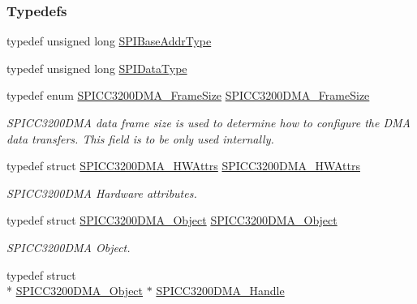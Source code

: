 \subsubsection*{Typedefs}
\begin{DoxyCompactItemize}
\item 
typedef unsigned long \hyperlink{_s_p_i_c_c3200_d_m_a_8h_a4b7e9f3739f6196bed13f9c3c549c96d}{S\-P\-I\-Base\-Addr\-Type}
\item 
typedef unsigned long \hyperlink{_s_p_i_c_c3200_d_m_a_8h_ac69c2f2d8cda29733c058bf8e0233af7}{S\-P\-I\-Data\-Type}
\item 
typedef enum \hyperlink{_s_p_i_c_c3200_d_m_a_8h_a886c3ca11a73823e4f3ab5eefc0fbebb}{S\-P\-I\-C\-C3200\-D\-M\-A\-\_\-\-Frame\-Size} \hyperlink{_s_p_i_c_c3200_d_m_a_8h_ad45a7b86b506d187ac96bc24d0475cd6}{S\-P\-I\-C\-C3200\-D\-M\-A\-\_\-\-Frame\-Size}
\begin{DoxyCompactList}\small\item\em S\-P\-I\-C\-C3200\-D\-M\-A data frame size is used to determine how to configure the D\-M\-A data transfers. This field is to be only used internally. \end{DoxyCompactList}\item 
typedef struct \hyperlink{struct_s_p_i_c_c3200_d_m_a___h_w_attrs}{S\-P\-I\-C\-C3200\-D\-M\-A\-\_\-\-H\-W\-Attrs} \hyperlink{_s_p_i_c_c3200_d_m_a_8h_a62f07fdc6837972d70b05231fc3b3501}{S\-P\-I\-C\-C3200\-D\-M\-A\-\_\-\-H\-W\-Attrs}
\begin{DoxyCompactList}\small\item\em S\-P\-I\-C\-C3200\-D\-M\-A Hardware attributes. \end{DoxyCompactList}\item 
typedef struct \hyperlink{struct_s_p_i_c_c3200_d_m_a___object}{S\-P\-I\-C\-C3200\-D\-M\-A\-\_\-\-Object} \hyperlink{_s_p_i_c_c3200_d_m_a_8h_a5a581b5a475f9cd3e8b23355cc30ab7f}{S\-P\-I\-C\-C3200\-D\-M\-A\-\_\-\-Object}
\begin{DoxyCompactList}\small\item\em S\-P\-I\-C\-C3200\-D\-M\-A Object. \end{DoxyCompactList}\item 
typedef struct \\*
\hyperlink{struct_s_p_i_c_c3200_d_m_a___object}{S\-P\-I\-C\-C3200\-D\-M\-A\-\_\-\-Object} $\ast$ \hyperlink{_s_p_i_c_c3200_d_m_a_8h_ae757f6e0468145143c9c839a4e3cf353}{S\-P\-I\-C\-C3200\-D\-M\-A\-\_\-\-Handle}
\end{DoxyCompactItemize}
